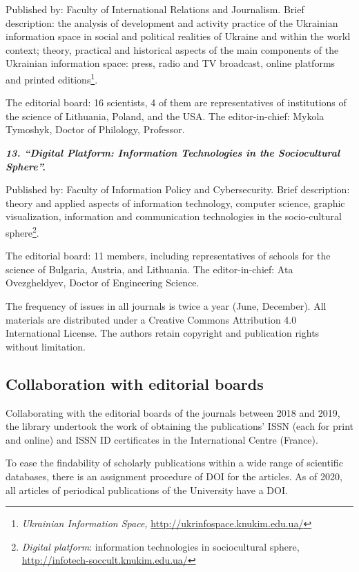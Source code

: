 \documentclass[a4paper,
fontsize=11pt,
oneside,
numbers=noperiodatend,
parskip=half-,
bibliography=totoc,
final
]{scrartcl}
\begin{document}
Published by: Faculty of International Relations and Journalism. Brief
description: the analysis of development and activity practice of the
Ukrainian information space in social and political realities of Ukraine
and within the world context; theory, practical and historical aspects
of the main components of the Ukrainian information space: press, radio
and TV broadcast, online platforms and printed editions\footnote{\emph{Ukrainian
  Information Space,} \url{http://ukrinfospace.knukim.edu.ua/}}.

The editorial board: 16 scientists, 4 of them are representatives of
institutions of the science of Lithuania, Poland, and the USA. The
editor-in-chief: Mykola Tymoshyk, Doctor of Philology, Professor.

\textbf{\emph{13. \enquote{Digital Platform: Information Technologies in
the Sociocultural Sphere}.}}

Published by: Faculty of Information Policy and Cybersecurity. Brief
description: theory and applied aspects of information technology,
computer science, graphic visualization, information and communication
technologies in the socio-cultural sphere\footnote{\emph{Digital
  platform}: information technologies in sociocultural sphere,
  \url{http://infotech-soccult.knukim.edu.ua/}}.

The editorial board: 11 members, including representatives of schools
for the science of Bulgaria, Austria, and Lithuania. The
editor-in-chief: Ata Ovezgheldyev, Doctor of Engineering Science.

The frequency of issues in all journals is twice a year (June,
December). All materials are distributed under a Creative Commons
Attribution 4.0 International License. The authors retain copyright and
publication rights without limitation.

\hypertarget{collaboration-with-editorial-boards}{%
\subsection{Collaboration with editorial
boards}\label{collaboration-with-editorial-boards}}

Collaborating with the editorial boards of the journals between 2018 and
2019, the library undertook the work of obtaining the publications' ISSN
(each for print and online) and ISSN ID certificates in the
International Centre (France).

To ease the findability of scholarly publications within a wide range of
scientific databases, there is an assignment procedure of DOI for the
articles. As of 2020, all articles of periodical publications of the
University have a DOI.
\end{document}
